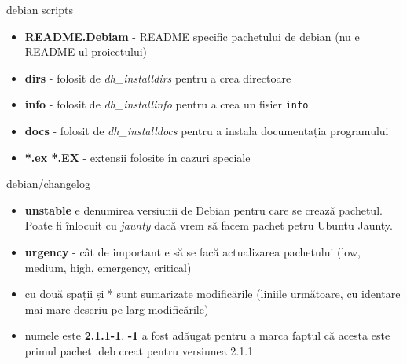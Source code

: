 \documentclass{beamer}
\begin{document}
\begin{frame}{debian\/ scripts}
  \begin{itemize}
    \begin{beamerboxesrounded}[lower=block body,shadow=true]{2\_rm\_unneeded.sh - delete unneeded files from debian\/}
      \small 
    \end{beamerboxesrounded}
  \item \textbf{README.Debiam} - README specific pachetului de debian (nu e README-ul proiectului)
  \item \textbf{dirs} - folosit de \textit{dh\_installdirs} pentru a crea directoare
  \item \textbf{info} - folosit de \textit{dh\_installinfo} pentru a crea un fisier \texttt{info}
  \item \textbf{docs} - folosit de \textit{dh\_installdocs} pentru a instala documentația programului
  \item \textbf{*.ex *.EX} - extensii folosite în cazuri speciale
  \end{itemize}
\end{frame}


\begin{frame}{debian/changelog}
  \begin{beamerboxesrounded}[lower=block body,shadow=true]{}
    \scriptsize 
  \end{beamerboxesrounded}
  \begin{itemize}
  \item \textbf{unstable} e denumirea versiunii de Debian pentru care se crează pachetul. 
    Poate fi înlocuit cu \textit{jaunty} dacă vrem să facem pachet petru Ubuntu Jaunty.
  \item \textbf{urgency} - cât de important e să se facă actualizarea pachetului 
    (low, medium, high, emergency, critical)
  \item cu două spații și * sunt sumarizate modificările (liniile următoare, cu identare mai
    mare descriu pe larg modificările)
  \item numele este \textbf{2.1.1-1}. \textbf{-1} a fost adăugat pentru a marca faptul că 
    acesta este primul pachet .deb creat pentru versiunea 2.1.1
  \end{itemize}
  
\end{frame}
\end{document}
